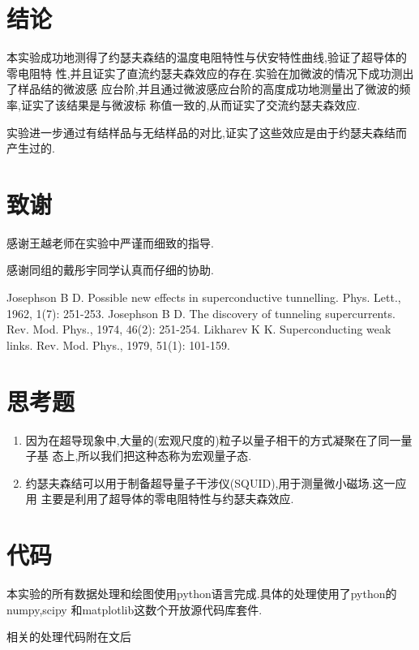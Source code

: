 \documentclass[aps,pre,12pt,preprint,onecolumn,showpacs,showkeys]{revtex4-1}
\begin{document}
\section{结论}

本实验成功地测得了约瑟夫森结的温度电阻特性与伏安特性曲线,验证了超导体的零电阻特
性,并且证实了直流约瑟夫森效应的存在.实验在加微波的情况下成功测出了样品结的微波感
应台阶,并且通过微波感应台阶的高度成功地测量出了微波的频率,证实了该结果是与微波标
称值一致的,从而证实了交流约瑟夫森效应.

实验进一步通过有结样品与无结样品的对比,证实了这些效应是由于约瑟夫森结而产生过的.

\section{致谢}

感谢王越老师在实验中严谨而细致的指导.

感谢同组的戴彤宇同学认真而仔细的协助.

\begin{thebibliography}{}
Josephson B D. Possible new effects in superconductive tunnelling. Phys. Lett., 1962, 1(7): 251-253. 
Josephson B D. The discovery of tunneling supercurrents. Rev. Mod. Phys., 1974, 46(2): 251-254. 
Likharev K K. Superconducting weak links. Rev. Mod. Phys., 1979, 51(1): 101-159. 
\end{thebibliography}

\clearpage
\appendix
\section{思考题}
\begin{enumerate}
    \item 因为在超导现象中,大量的(宏观尺度的)粒子以量子相干的方式凝聚在了同一量子基
        态上,所以我们把这种态称为宏观量子态.
    \item 约瑟夫森结可以用于制备超导量子干涉仪(SQUID),用于测量微小磁场.这一应用
        主要是利用了超导体的零电阻特性与约瑟夫森效应.
\end{enumerate}

\section{代码}

本实验的所有数据处理和绘图使用python语言完成.具体的处理使用了python的numpy,scipy
和matplotlib这数个开放源代码库套件.

相关的处理代码附在文后









\end{document}
